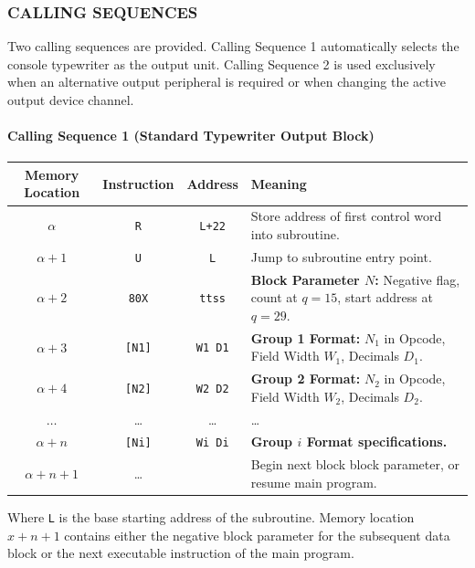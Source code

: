\subsubsection*{CALLING SEQUENCES}
Two calling sequences are provided. Calling Sequence 1 automatically selects the console typewriter as the output unit. Calling Sequence 2 is used exclusively when an alternative output peripheral is required or when changing the active output device channel.

\paragraph{Calling Sequence 1 (Standard Typewriter Output Block)}
\begin{table}[h!]
\centering
\begin{tabularx}{\textwidth}{cccX}
\toprule
\textbf{Memory Location} & \textbf{Instruction} & \textbf{Address} & \textbf{Meaning} \\
\midrule
$\alpha$               & \texttt{R}      & \texttt{L+22}    & Store address of first control word into subroutine. \\
$\alpha+1$             & \texttt{U}      & \texttt{L}       & Jump to subroutine entry point. \\
$\alpha+2$             & \texttt{80X}    & \texttt{ttss}    & \textbf{Block Parameter $N$:} Negative flag, count at $q=15$, start address at $q=29$. \\
$\alpha+3$             & \texttt{[N1]}   & \texttt{W1 D1}   & \textbf{Group 1 Format:} $N_1$ in Opcode, Field Width $W_1$, Decimals $D_1$. \\
$\alpha+4$             & \texttt{[N2]}   & \texttt{W2 D2}   & \textbf{Group 2 Format:} $N_2$ in Opcode, Field Width $W_2$, Decimals $D_2$. \\
$\dots$           & \dots           & \dots            & \dots \\
$\alpha+n$             & \texttt{[Ni]}   & \texttt{Wi Di}   & \textbf{Group $i$ Format specifications.} \\
$\alpha+n+1$           & \dots           &                  & Begin next block block parameter, or resume main program. \\
\bottomrule
\end{tabularx}
\end{table}
Where \texttt{L} is the base starting address of the subroutine. Memory location $x+n+1$ contains either the negative block parameter for the subsequent data block or the next executable instruction of the main program.

